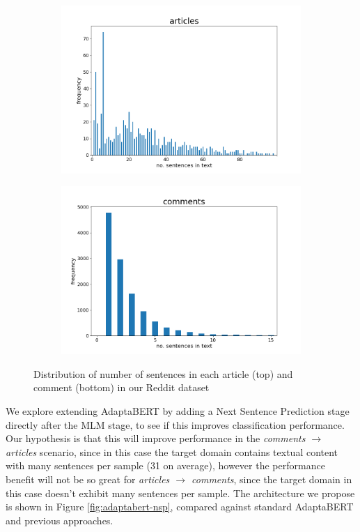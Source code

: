 \begin{figure}[ht]
    \centering
    \begin{subfigure}{\textwidth}
        \centering
        \includegraphics[scale=0.45]{0-img/num-sentences-distribution-articles.png}
    \end{subfigure}
    \begin{subfigure}{\textwidth}
        \centering
        \includegraphics[scale=0.45]{0-img/num-sentences-distribution-comments.png}
    \end{subfigure}
    \caption{Distribution of number of sentences in each article (top) and comment (bottom) in our Reddit dataset}
    \label{fig:num-sentences-distributions}
\end{figure}

We explore extending AdaptaBERT by adding a Next Sentence Prediction stage directly after the MLM stage, to see if this improves classification performance. Our hypothesis is that this will improve performance in the \textit{comments $ \rightarrow $ articles} scenario, since in this case the target domain contains textual content with many sentences per sample (31 on average), however the performance benefit will not be so great for \textit{articles $ \rightarrow $ comments}, since the target domain in this case doesn't exhibit many sentences per sample. The architecture we propose is shown in Figure \ref{fig:adaptabert-nsp}, compared against standard AdaptaBERT and previous approaches.


